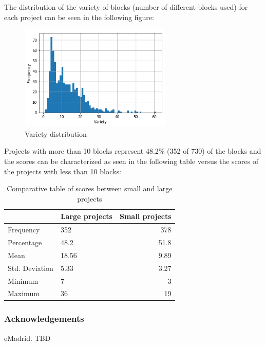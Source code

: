 \documentclass[a4paper]{article}
\begin{document}
The distribution of the variety of blocks (number of different blocks used) for each project can be seen in the following figure:

\begin{figure}[ht]
\begin{center}
\includegraphics[height=5cm]{fig1}
\caption{Variety distribution }
\label{fig1}
\end{center}
\end{figure}

Projects with more than 10 blocks represent 48.2\% (352 of 730) of the blocks and the scores can be characterized as seen in the following table versus the scores of the projects with less than 10 blocks:

\begin{table}[ht]
\begin{center}
\caption{Comparative table of scores between small and large projects}

\bigskip

\begin{tabular}{|l|l|r|}
\hline
& Large projects & Small projects \\ \hline
Frequency & 352 & 378\\ \hline
Percentage & 48.2 & 51.8\\ \hline
Mean & 18.56 & 9.89\\ \hline
Std. Deviation & 5.33 & 3.27\\ \hline
Minimum & 7 & 3\\ \hline
Maximum & 36 & 19\\ \hline
\end{tabular}
\end{center}
\end{table}


\subsubsection{Acknowledgements}

eMadrid. TBD


 

\end{document}
